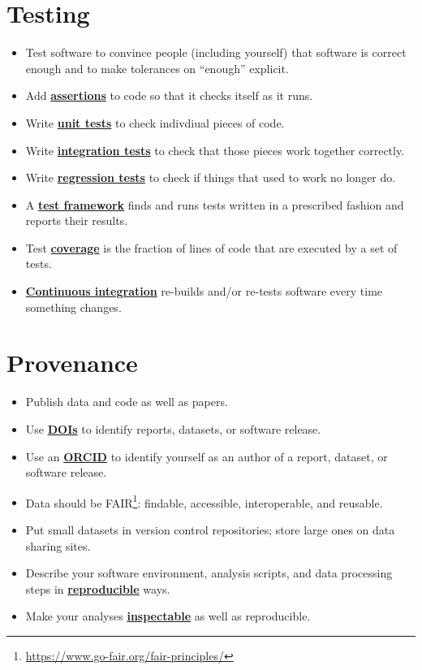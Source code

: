 \documentclass[
]{krantz}
\providecommand{\tightlist}{%
  \setlength{\itemsep}{0pt}\setlength{\parskip}{0pt}}
\renewcommand{\href}[2]{#2\footnote{\url{#1}}}
\newcommand{\gref}[2]{\hyperlink{#2}{\textbf{#1}}}
\begin{document}
\hypertarget{testing-2}{%
\section{Testing}\label{testing-2}}

\begin{itemize}
\tightlist
\item
  Test software to convince people (including yourself) that software is correct enough
  and to make tolerances on ``enough'' explicit.
\item
  Add \gref{assertions}{assertion} to code so that it checks itself as it runs.
\item
  Write \gref{unit tests}{unit\_test} to check indivdiual pieces of code.
\item
  Write \gref{integration tests}{integration\_test} to check that those pieces work together correctly.
\item
  Write \gref{regression tests}{regression\_testing} to check if things that used to work no longer do.
\item
  A \gref{test framework}{test\_framework} finds and runs tests written in a prescribed fashion and reports their results.
\item
  Test \gref{coverage}{code\_coverage} is the fraction of lines of code that are executed by a set of tests.
\item
  \gref{Continuous integration}{continuous\_integration} re-builds and/or re-tests software every time something changes.
\end{itemize}

\hypertarget{provenance-2}{%
\section{Provenance}\label{provenance-2}}

\begin{itemize}
\tightlist
\item
  Publish data and code as well as papers.
\item
  Use \gref{DOIs}{doi} to identify reports, datasets, or software release.
\item
  Use an \gref{ORCID}{orcid} to identify yourself as an author of a report, dataset, or software release.
\item
  Data should be \href{https://www.go-fair.org/fair-principles/}{FAIR}: findable, accessible, interoperable, and reusable.
\item
  Put small datasets in version control repositories; store large ones on data sharing sites.
\item
  Describe your software environment, analysis scripts, and data processing steps in \gref{reproducible}{reproducible\_research} ways.
\item
  Make your analyses \gref{inspectable}{inspectability} as well as reproducible.
\end{itemize}
\end{document}
